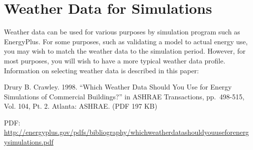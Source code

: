 \section{Weather Data for Simulations}\label{weather-data-for-simulations}

Weather data can be used for various purposes by simulation program such as EnergyPlus. For some purposes, such as validating a model to actual energy use, you may wish to match the weather data to the simulation period. However, for most purposes, you will wish to have a more typical weather data profile. Information on selecting weather data is described in this paper:

Drury B. Crawley. 1998. ``Which Weather Data Should You Use for Energy Simulations of Commercial Buildings?'' in ASHRAE Transactions, pp.~498-515, Vol. 104, Pt. 2. Atlanta: ASHRAE. (PDF 197 KB)

PDF: \url{http://energyplus.gov/pdfs/bibliography/whichweatherdatashouldyouuseforenergysimulations.pdf}
